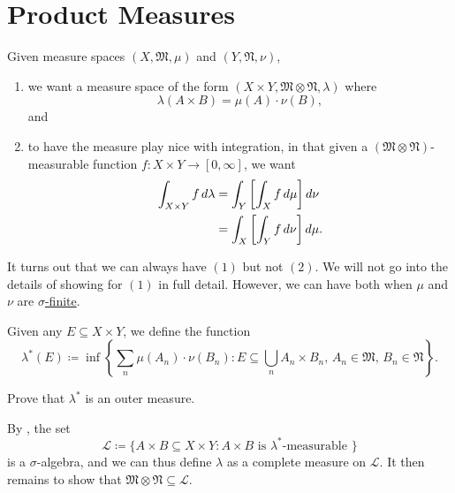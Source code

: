 \documentclass[notoc,notitlepage]{tufte-book}
\begin{document}

\section{Product Measures}%
\label{sec:product_measures}

\begin{note}
  Given measure spaces $(X, \mathfrak{M}, \mu)$ and $(Y, \mathfrak{N}, \nu)$,
  \begin{enumerate}
    \item we want a measure space of the form $(X \times Y, \mathfrak{M} \otimes
      \mathfrak{N}, \lambda)$ where
      \begin{equation*}
        \lambda(A \times B) = \mu(A) \cdot \nu(B),
      \end{equation*}
      and
    \item to have the measure play nice with integration, in that
      given a $(\mathfrak{M} \otimes \mathfrak{N})$-measurable function
      $f : X \times Y \to [0, \infty]$, we want
      \begin{align*}
        \int_{X \times Y} f \mathop{}\!d{\lambda}
        &= \int_{Y} \left[ \int_{X} f \mathop{}\!d{\mu} \right] \mathop{}\!d{\nu} \\
        &= \int_{X} \left[ \int_{Y} f \mathop{}\!d{\nu} \right] \mathop{}\!d{\mu}.
      \end{align*}
  \end{enumerate}
  It turns out that we can always have $(1)$ but not $(2)$.
  We will not go into the details of showing for $(1)$ in full detail.
  However, we can have both when $\mu$ and $\nu$ are
  \hyperref[defn:finitivity_sigma_finitivity_and_semi_finitivity_of_a_measure]{$\sigma$-finite}.
\end{note}

\begin{note}
  Given any $E \subseteq X \times Y$, we define the function
  \begin{equation*}
    \lambda^*(E) \coloneqq \inf \left\{ 
      \sum_n \mu(A_n) \cdot \nu(B_n)
        : E \subseteq \bigcup_n A_n \times B_n,\,
          A_n \in \mathfrak{M},\, B_n \in \mathfrak{N}
    \right\}.
  \end{equation*}
  \begin{ex}
    Prove that $\lambda^*$ is an outer measure.
  \end{ex}
  By , the set
  \begin{equation*}
    \mathcal{L} \coloneqq \{ A \times B \subseteq X \times Y
        : A \times B \text{ is } \lambda^*\text{-measurable } \}
  \end{equation*}
  is a $\sigma$-algebra, and we can thus define
  $\lambda$ as a complete measure on $\mathcal{L}$.
  It then remains to show that
  $\mathfrak{M} \otimes \mathfrak{N} \subseteq \mathcal{L}$.
\end{note}
\end{document}
